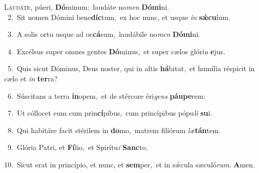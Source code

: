 \lettrine{\initial\textcolor{\initialcolor}{L}}{audáte,} púeri, \textbf{Dó}\-minum:~\star laudáte no\textit{men} \textbf{Dó}\-\textbf{mi}ni.\\
{\numbfont\textcolor{\numbcolor}{~2.}}~Sit nomen Dómini bene\-\textbf{díc}\-tum,~\star ex hoc nunc, et usque \textit{in} \textbf{sǽ}\-\textbf{cu}lum.\par
{\numbfont\textcolor{\numbcolor}{~3.}}~A solis ortu usque ad oc\-\textbf{cá}\-sum,~\star laudábile no\textit{men} \textbf{Dó}\-\textbf{mi}ni.\par
{\numbfont\textcolor{\numbcolor}{~4.}}~Excélsus super omnes gentes \textbf{Dó}\-minus,~\star et super cælos glóri\textit{a} \textbf{e}\-jus.\par
{\numbfont\textcolor{\numbcolor}{~5.}}~Quis sicut Dóminus, Deus noster, qui in altis \textbf{há}\-bitat,~\star et humília réspicit in cælo et \textit{in} \textbf{ter}\-ra?\par
{\numbfont\textcolor{\numbcolor}{~6.}}~Súscitans a terra \textbf{ín}\-opem,~\star et de stércore éri\textit{gens} \textbf{páu}\-\textbf{pe}rem:\par
{\numbfont\textcolor{\numbcolor}{~7.}}~Ut cóllocet eum cum prin\-\textbf{cí}\-pibus,~\star cum princípibus pópu\textit{li} \textbf{su}\-i.\par
{\numbfont\textcolor{\numbcolor}{~8.}}~Qui habitáre facit stérilem in \textbf{do}\-mo,~\star matrem filiórum \textit{læ}\-\textbf{tán}tem.\par
{\numbfont\textcolor{\numbcolor}{~9.}}~Glória Patri, et \textbf{Fí}\-lio,~\star et Spirítu\textit{i} \textbf{Sanc}\-to.\par
{\numbfont\textcolor{\numbcolor}{10.}}~Sicut erat in princípio, et nunc, et \textbf{sem}\-per,~\star et in sǽcula sæculó\-\textit{rum}\-. \textbf{A}\-men.\par
